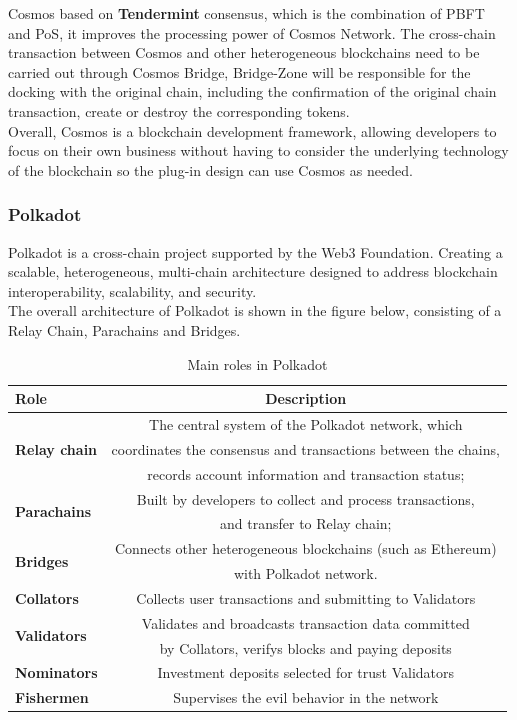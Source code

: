 \noindent Cosmos based on \textbf{Tendermint} consensus, which is the combination of PBFT and PoS, it improves the processing power of Cosmos Network. The cross-chain transaction between Cosmos and other heterogeneous blockchains need to be carried out through Cosmos Bridge, Bridge-Zone will be responsible for the docking with the original chain, including the confirmation of the original chain transaction, create or destroy the corresponding tokens.\\
\noindent Overall, Cosmos is a blockchain development framework, allowing developers to focus on their own business without having to consider the underlying technology of the blockchain so the plug-in design can use Cosmos as needed.


\subsubsection{Polkadot}
\noindent Polkadot\cite{polkadot} is a cross-chain project supported by the Web3 Foundation. Creating a scalable, heterogeneous, multi-chain architecture designed to address blockchain interoperability, scalability, and security.\\
\noindent The overall architecture of Polkadot is shown in the figure below, consisting of a Relay Chain, Parachains and Bridges. \\

\begin{table}[H]
\begin{tabular}{l|c}

Role& Description \\
\hline
\multirow{3}{1in}{\textbf{Relay chain}}& The central system of the Polkadot network, which \\& coordinates the consensus and transactions between the chains, \\& records account information and transaction status; \\
\hline
\multirow{2}{1in}{\textbf{Parachains}}& Built by developers to collect and process transactions,\\&and transfer to Relay chain; \\
\hline
\multirow{2}{1in}{\textbf{Bridges}} & Connects other heterogeneous blockchains (such as Ethereum) \\& with Polkadot network.\\
\hline
\textbf{Collators} & Collects user transactions and submitting to Validators\\
\hline
\multirow{2}{1in}{\textbf{Validators}} &Validates and broadcasts transaction data committed\\ & by Collators, verifys blocks and paying deposits\\
\hline
\textbf{Nominators} &Investment deposits selected for trust Validators \\
\hline
\textbf{Fishermen} &Supervises the evil behavior in the network\\
\hline
\end{tabular}
\caption{Main roles in Polkadot}
\end{table}

